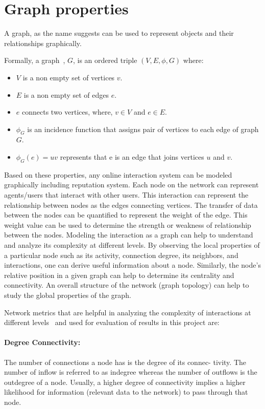 \section{Graph properties}
A graph, as the name suggests can be used to represent objects and their
relationships graphically. \par
Formally, a graph~\cite{bondy1976graph}, $G$, is an ordered triple $(V,E,\phi,
G)$ where:
\begin{itemize}
	\item $V$ is a non empty set of vertices $v$.
	\item $E$ is a non empty set of edges $e$.
	\item $e$ connects two vertices, where, $v \in V$ and $e \in E$.
	\item $\phi_G$ is an incidence function that assigns pair of vertices to
		each edge of graph $G$. 
	\item $\phi_G(e) = uv$ represents that e is an edge that joins vertices $u$
		and $v$.
\end{itemize}
Based on these properties, any online interaction system can be modeled
graphically including reputation system. Each node on the network can represent
agents/users that interact with other users. This interaction can represent the
relationship between nodes as the edges connecting vertices. The transfer of
data between the nodes can be quantified to represent the weight of the edge.
This weight value can be used to determine the strength or weakness of
relationship between the nodes. Modeling the interaction as a graph can help to
understand and analyze its complexity at different levels. By observing the
local properties of a particular node such as its activity, connection degree,
its neighbors, and interactions, one can derive useful information about a
node. Similarly, the node’s relative position in a given graph can help to
determine its centrality and connectivity. An overall structure of the network
(graph topology) can help to study the global properties of the graph. \par
Network metrics that are helpful in analyzing the complexity of interactions at
different levels~\cite{gkorou2014exploiting} and used for evaluation of results
in this project are:
\paragraph{Degree Connectivity:} The number of connections a node has is the
degree of its connec- tivity. The number of inflow is referred to as indegree
whereas the number of outflows is the outdegree of a node. Usually, a higher
degree of connectivity implies a higher likelihood for information (relevant
data to the network) to pass through that node.  
